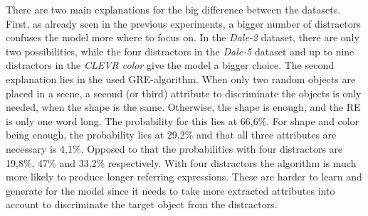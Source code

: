 There are two main explanations for the big difference between the datasets.
First, as already seen in the previous experiments, a bigger number of distractors confuses the model more where to focus on.
In the \emph{Dale-2} dataset, there are only two possibilities, while the four distractors in the \emph{Dale-5} dataset and up to nine distractors in the \emph{CLEVR color} give the model a bigger choice.
The second explanation lies in the used GRE-algorithm.
When only two random objects are placed in a scene, a second (or third) attribute to discriminate the objects is only needed, when the shape is the same.
Otherwise, the shape is enough, and the RE is only one word long.
The probability for this lies at 66,6\%.
For shape and color being enough, the probability lies at 29,2\% and that all three attributes are necessary is 4,1\%.
Opposed to that the probabilities with four distractors are 19,8\%, 47\% and 33,2\% respectively.
With four distractors the algorithm is much more likely to produce longer referring expressions.
These are harder to learn and generate for the model since it needs to take more extracted attributes into account to discriminate the target object from the distractors.
